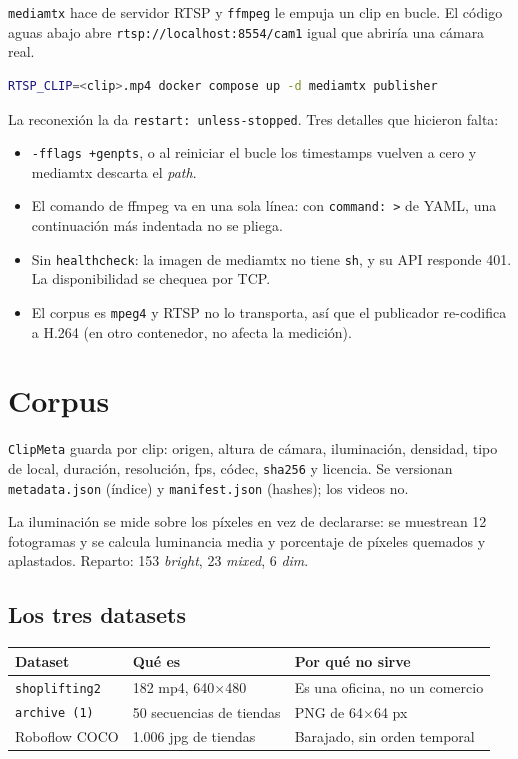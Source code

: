\documentclass[11pt,a4paper]{article}
\begin{document}
\texttt{mediamtx} hace de servidor RTSP y \texttt{ffmpeg} le empuja un clip en
bucle. El código aguas abajo abre \texttt{rtsp://localhost:8554/cam1} igual que
abriría una cámara real.

\begin{lstlisting}[language=bash]
RTSP_CLIP=<clip>.mp4 docker compose up -d mediamtx publisher
\end{lstlisting}

La reconexión la da \texttt{restart: unless-stopped}. Tres detalles que hicieron
falta:

\begin{itemize}[leftmargin=*]
  \item \texttt{-fflags +genpts}, o al reiniciar el bucle los timestamps vuelven
        a cero y mediamtx descarta el \emph{path}.
  \item El comando de ffmpeg va en una sola línea: con \texttt{command: >} de
        YAML, una continuación más indentada no se pliega.
  \item Sin \texttt{healthcheck}: la imagen de mediamtx no tiene \texttt{sh}, y
        su API responde 401. La disponibilidad se chequea por TCP.
  \item El corpus es \texttt{mpeg4} y RTSP no lo transporta, así que el
        publicador re-codifica a H.264 (en otro contenedor, no afecta la medición).
\end{itemize}

\section{Corpus}

\texttt{ClipMeta} guarda por clip: origen, altura de cámara, iluminación,
densidad, tipo de local, duración, resolución, fps, códec, \texttt{sha256} y
licencia. Se versionan \texttt{metadata.json} (índice) y \texttt{manifest.json}
(hashes); los videos no.

La iluminación se mide sobre los píxeles en vez de declararse: se muestrean 12
fotogramas y se calcula luminancia media y porcentaje de píxeles quemados y
aplastados. Reparto: 153 \emph{bright}, 23 \emph{mixed}, 6 \emph{dim}.

\subsection*{Los tres datasets}

\begin{center}
\begin{tabular}{@{}lll@{}}
\toprule
\textbf{Dataset} & \textbf{Qué es} & \textbf{Por qué no sirve} \\
\midrule
\texttt{shoplifting2} & 182 mp4, 640$\times$480 & Es una oficina, no un comercio \\
\texttt{archive (1)}  & 50 secuencias de tiendas & PNG de 64$\times$64 px \\
Roboflow COCO         & 1.006 jpg de tiendas & Barajado, sin orden temporal \\
\bottomrule
\end{tabular}
\end{center}
\end{document}
